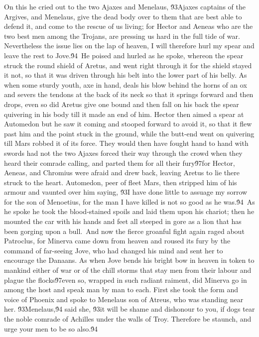 {On this he cried out to the two Ajaxes and Menelaus, \'93Ajaxes captains of the Argives, and Menelaus, give the dead body over to them that are best able to defend it, and come to the rescue of us living; for Hector and Aeneas who are the two best men among the Trojans, are pressing us hard in the full tide of war. Nevertheless the issue lies on the lap of heaven, I will therefore hurl my spear and leave the rest to Jove.\'94\
He poised and hurled as he spoke, whereon the spear struck the round shield of Aretus, and went right through it for the shield stayed it not, so that it was driven through his belt into the lower part of his belly. As when some sturdy youth, axe in hand, deals his blow behind the horns of an ox and severs the tendons at the back of its neck so that it springs forward and then drops, even so did Aretus give one bound and then fall on his back the spear quivering in his body till it made an end of him. Hector then aimed a spear at Automedon but he saw it coming and stooped forward to avoid it, so that it flew past him and the point stuck in the ground, while the butt-end went on quivering till Mars robbed it of its force. They would then have fought hand to hand with swords had not the two Ajaxes forced their way through the crowd when they heard their comrade calling, and parted them for all their fury\'97for Hector, Aeneas, and Chromius were afraid and drew back, leaving Aretus to lie there struck to the heart. Automedon, peer of fleet Mars, then stripped him of his armour and vaunted over him saying, \'93I have done little to assuage my sorrow for the son of Menoetius, for the man I have killed is not so good as he was.\'94\
As he spoke he took the blood-stained spoils and laid them upon his chariot; then he mounted the car with his hands and feet all steeped in gore as a lion that has been gorging upon a bull.\
And now the fierce groanful fight again raged about Patroclus, for Minerva came down from heaven and roused its fury by the command of far-seeing Jove, who had changed his mind and sent her to encourage the Danaans. As when Jove bends his bright bow in heaven in token to mankind either of war or of the chill storms that stay men from their labour and plague the flocks\'97even so, wrapped in such radiant raiment, did Minerva go in among the host and speak man by man to each. First she took the form and voice of Phoenix and spoke to Menelaus son of Atreus, who was standing near her. \'93Menelaus,\'94 said she, \'93it will be shame and dishonour to you, if dogs tear the noble comrade of Achilles under the walls of Troy. Therefore be staunch, and urge your men to be so also.\'94\
}
